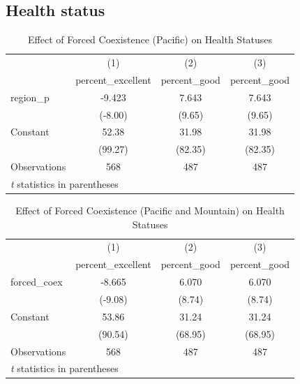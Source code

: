 \documentclass[12pt]{article}
\begin{document}
\subsection{Health status}
\begin{table}[htbp]\centering \caption{Effect of Forced Coexistence (Pacific) on Health Statuses\label{statusp}} \begin{tabular}{l*{3}{c}} \toprule
                    &\multicolumn{1}{c}{(1)}&\multicolumn{1}{c}{(2)}&\multicolumn{1}{c}{(3)}\\
                    &\multicolumn{1}{c}{percent\_excellent}&\multicolumn{1}{c}{percent\_good}&\multicolumn{1}{c}{percent\_good}\\
\midrule
region\_p            &      -9.423&       7.643&       7.643\\
                    &     (-8.00)&      (9.65)&      (9.65)\\
\addlinespace
Constant            &       52.38&       31.98&       31.98\\
                    &     (99.27)&     (82.35)&     (82.35)\\
\midrule
Observations        &         568&         487&         487\\
\bottomrule
\multicolumn{4}{l}{\footnotesize \textit{t} statistics in parentheses}\\
\end{tabular}
\end{table}


\begin{table}[htbp]\centering \caption{Effect of Forced Coexistence (Pacific and Mountain) on Health Statuses\label{statuspm}} \begin{tabular}{l*{3}{c}} \toprule
                    &\multicolumn{1}{c}{(1)}&\multicolumn{1}{c}{(2)}&\multicolumn{1}{c}{(3)}\\
                    &\multicolumn{1}{c}{percent\_excellent}&\multicolumn{1}{c}{percent\_good}&\multicolumn{1}{c}{percent\_good}\\
\midrule
forced\_coex         &      -8.665&       6.070&       6.070\\
                    &     (-9.08)&      (8.74)&      (8.74)\\
\addlinespace
Constant            &       53.86&       31.24&       31.24\\
                    &     (90.54)&     (68.95)&     (68.95)\\
\midrule
Observations        &         568&         487&         487\\
\bottomrule
\multicolumn{4}{l}{\footnotesize \textit{t} statistics in parentheses}\\
\end{tabular}
\end{table}
\end{document}
